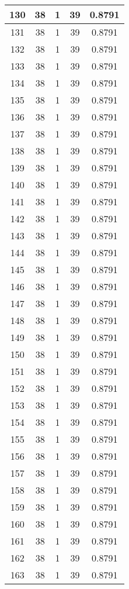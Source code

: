 \documentclass[letterpaper, 12pt]{article}
\begin{document}
\begin{longtable}{|c|c|c|c|c|}
\hline
130 & 38 & 1 & 39 & 0.8791 \\
\hline
131 & 38 & 1 & 39 & 0.8791 \\
\hline
132 & 38 & 1 & 39 & 0.8791 \\
\hline
133 & 38 & 1 & 39 & 0.8791 \\
\hline
134 & 38 & 1 & 39 & 0.8791 \\
\hline
135 & 38 & 1 & 39 & 0.8791 \\
\hline
136 & 38 & 1 & 39 & 0.8791 \\
\hline
137 & 38 & 1 & 39 & 0.8791 \\
\hline
138 & 38 & 1 & 39 & 0.8791 \\
\hline
139 & 38 & 1 & 39 & 0.8791 \\
\hline
140 & 38 & 1 & 39 & 0.8791 \\
\hline
141 & 38 & 1 & 39 & 0.8791 \\
\hline
142 & 38 & 1 & 39 & 0.8791 \\
\hline
143 & 38 & 1 & 39 & 0.8791 \\
\hline
144 & 38 & 1 & 39 & 0.8791 \\
\hline
145 & 38 & 1 & 39 & 0.8791 \\
\hline
146 & 38 & 1 & 39 & 0.8791 \\
\hline
147 & 38 & 1 & 39 & 0.8791 \\
\hline
148 & 38 & 1 & 39 & 0.8791 \\
\hline
149 & 38 & 1 & 39 & 0.8791 \\
\hline
150 & 38 & 1 & 39 & 0.8791 \\
\hline
151 & 38 & 1 & 39 & 0.8791 \\
\hline
152 & 38 & 1 & 39 & 0.8791 \\
\hline
153 & 38 & 1 & 39 & 0.8791 \\
\hline
154 & 38 & 1 & 39 & 0.8791 \\
\hline
155 & 38 & 1 & 39 & 0.8791 \\
\hline
156 & 38 & 1 & 39 & 0.8791 \\
\hline
157 & 38 & 1 & 39 & 0.8791 \\
\hline
158 & 38 & 1 & 39 & 0.8791 \\
\hline
159 & 38 & 1 & 39 & 0.8791 \\
\hline
160 & 38 & 1 & 39 & 0.8791 \\
\hline
161 & 38 & 1 & 39 & 0.8791 \\
\hline
162 & 38 & 1 & 39 & 0.8791 \\
\hline
163 & 38 & 1 & 39 & 0.8791 \\

\end{longtable}
\end{document}
